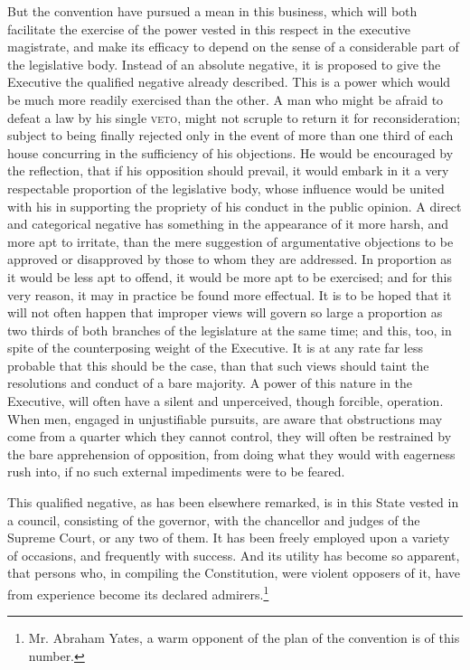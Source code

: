 But the convention have pursued a mean in this business, which will both facilitate the exercise of the power vested in this respect in the executive magistrate, and make its efficacy to depend on the sense of a considerable part of the legislative body. 
Instead of an absolute negative, it is proposed to give the Executive the qualified negative already described. 
This is a power which would be much more readily exercised than the other. 
A man who might be afraid to defeat a law by his single \textsc{veto}, might not scruple to return it for reconsideration; subject to being finally rejected only in the event of more than one third of each house concurring in the sufficiency of his objections. 
He would be encouraged by the reflection, that if his opposition should prevail, it would embark in it a very respectable proportion of the legislative body, whose influence would be united with his in supporting the propriety of his conduct in the public opinion. 
A direct and categorical negative has something in the appearance of it more harsh, and more apt to irritate, than the mere suggestion of argumentative objections to be approved or disapproved by those to whom they are addressed. 
In proportion as it would be less apt to offend, it would be more apt to be exercised; and for this very reason, it may in practice be found more effectual. 
It is to be hoped that it will not often happen that improper views will govern so large a proportion as two thirds of both branches of the legislature at the same time; and this, too, in spite of the counterposing weight of the Executive. 
It is at any rate far less probable that this should be the case, than that such views should taint the resolutions and conduct of a bare majority. 
A power of this nature in the Executive, will often have a silent and unperceived, though forcible, operation. 
When men, engaged in unjustifiable pursuits, are aware that obstructions may come from a quarter which they cannot control, they will often be restrained by the bare apprehension of opposition, from doing what they would with eagerness rush into, if no such external impediments were to be feared.

This qualified negative, as has been elsewhere remarked, is in this State vested in a council, consisting of the governor, with the chancellor and judges of the Supreme Court, or any two of them. 
It has been freely employed upon a variety of occasions, and frequently with success. 
And its utility has become so apparent, that persons who, in compiling the Constitution, were violent opposers of it, have from experience become its declared admirers.\footnote{Mr. 
Abraham Yates, a warm opponent of the plan of the convention is of this number.}

